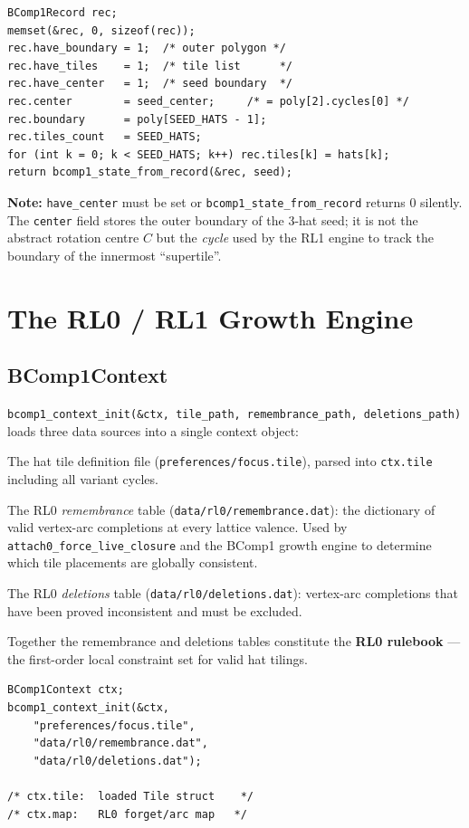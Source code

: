 \documentclass[10pt,a4paper]{article}
\let\polysection\section
\renewcommand\section{\needspace{0.16\textheight}\polysection}
\let\polysubsection\subsection
\renewcommand\subsection{\needspace{0.12\textheight}\polysubsection}
\newcommand{\code}[1]{\texttt{\small #1}}
\newcommand{\file}[1]{\texttt{\footnotesize #1}}
\begin{document}
\begin{verbatim}
BComp1Record rec;
memset(&rec, 0, sizeof(rec));
rec.have_boundary = 1;  /* outer polygon */
rec.have_tiles    = 1;  /* tile list      */
rec.have_center   = 1;  /* seed boundary  */
rec.center        = seed_center;     /* = poly[2].cycles[0] */
rec.boundary      = poly[SEED_HATS - 1];
rec.tiles_count   = SEED_HATS;
for (int k = 0; k < SEED_HATS; k++) rec.tiles[k] = hats[k];
return bcomp1_state_from_record(&rec, seed);
\end{verbatim}

\noindent \textbf{Note:} \code{have\_center} must be set or
\code{bcomp1\_state\_from\_record} returns 0 silently.  The \code{center}
field stores the outer boundary of the 3-hat seed; it is not the abstract
rotation centre $C$ but the \emph{cycle} used by the RL1 engine to track the
boundary of the innermost ``supertile''.

\section{The RL0 / RL1 Growth Engine}

\subsection{BComp1Context}

\begin{tcolorbox}[dualbox, title={\code{BComp1Context} — what is loaded}]
  \code{bcomp1\_context\_init(\&ctx, tile\_path, remembrance\_path, deletions\_path)}
  loads three data sources into a single context object:
  \begin{description}[leftmargin=0pt,style=nextline]
    \item[\code{tile\_path}] The hat tile definition file
      (\file{preferences/focus.tile}), parsed into \code{ctx.tile}
      including all variant cycles.
    \item[\code{remembrance\_path}] The RL0 \emph{remembrance} table
      (\file{data/rl0/remembrance.dat}): the dictionary of valid vertex-arc
      completions at every lattice valence.  Used by \code{attach0\_force\_live\_closure}
      and the BComp1 growth engine to determine which tile placements are
      globally consistent.
    \item[\code{deletions\_path}] The RL0 \emph{deletions} table
      (\file{data/rl0/deletions.dat}): vertex-arc completions that have
      been proved inconsistent and must be excluded.
  \end{description}
  Together the remembrance and deletions tables constitute the \textbf{RL0 rulebook}
  — the first-order local constraint set for valid hat tilings.
\tcblower
\begin{verbatim}
BComp1Context ctx;
bcomp1_context_init(&ctx,
    "preferences/focus.tile",
    "data/rl0/remembrance.dat",
    "data/rl0/deletions.dat");

/* ctx.tile:  loaded Tile struct    */
/* ctx.map:   RL0 forget/arc map   */
\end{verbatim}
\end{tcolorbox}
\end{document}
